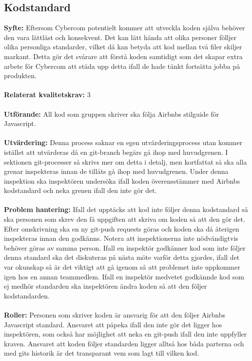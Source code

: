 \documentclass[10pt]{article}
\begin{document}
	\subsection{Kodstandard}
	\textbf{Syfte:}	Eftersom Cybercom potentielt kommer att utveckla koden själva behöver den vara lättläst och konsekvent. Det kan lätt hända att olika personer fölljer olika personliga standarder, vilket då kan betyda att kod mellan två filer skiljer markant. Detta gör det svårare att förstå koden samtidigt som det skapar extra arbete för Cybercom att städa upp detta ifall de hade tänkt fortsätta jobba på produkten.
	\\\\
	\textbf{Relaterat kvalitetskrav:} 3
	\\\\
	\textbf{Utförande:} All kod som gruppen skriver ska följa Airbnbs stilguide för Javascript\cite{bib-airbnb}.
	\\\\
	\textbf{Utvärdering:} Denna process saknar en egen utvärderingsprocess utan kommer istället att utvärderas då en git-branch begärs gå ihop med huvudgrenen. I sektionen git-processer så skrivs mer om detta i detalj, men kortfattat så ska alla grenar inspekteras innan de tillåts gå ihop med huvudgrenen. Under denna inspektion ska inspektören undersöka ifall koden överensstämmer med Airbnbs kodstandard och neka grenen ifall den inte gör det.
	\\\\
	\textbf{Problem hantering:} Ifall det upptäcks att kod inte följer denna kodstandard så ska personen som skrev den få uppgiften att skriva om koden så att den gör det. Efter omskrivning ska en ny git-push requests göras och koden ska då återigen inspekteras innan den godkänns. Notera att inspektionerna inte nödvändigtvis behöver göras av samma person.
	Ifall en inspektör godkänner kod som inte följer denna standard ska det diskuteras på nästa möte varför detta gjordes, ifall det var okunskap så är det viktigt att gå igenom så att problemet inte uppkommer igen hos en annan teammedlem. Ifall en inspektör medvetet godkännde kod som ej medhör standarden ska inspektören ändra koden så att den följer kodstandarden.
	\\\\
	\textbf{Roller:} Personen som skriver koden är ansvarig för att den följer Airbnbs Javascript standard. Ansvaret att påpeka ifall den inte gör det ligger hos inspektören, som också har möjlighet att neka en git-push ifall den inte uppfyller kraven. Ansvaret att koden följer standarden ligger alltså hos båda parterna och med gits historik är det transparant vem som lagt till vilken kod.
	
\end{document}
